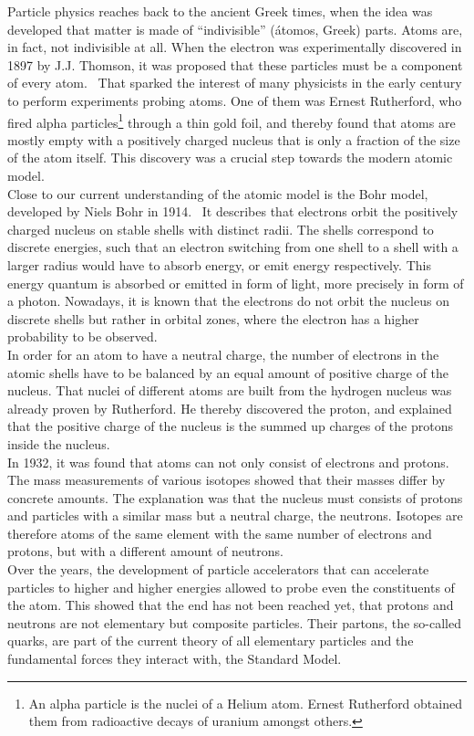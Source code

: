 Particle physics reaches back to the ancient Greek times, when the idea was developed that matter is made of ``indivisible'' (\'atomos, Greek) parts.
Atoms are, in fact, not indivisible at all.
When the electron was experimentally discovered in 1897 by J.J. Thomson, it was proposed that these particles must be a component of every atom.~\cite[p. 13ff]{Griffiths}
That sparked the interest of many physicists in the early  century to perform experiments probing atoms.
One of them was Ernest Rutherford, who fired alpha particles\footnote{An alpha particle is the nuclei of a Helium atom. Ernest Rutherford obtained them from radioactive decays of uranium amongst others.} through a thin gold foil, and thereby found that atoms are mostly empty with a positively charged nucleus that is only a fraction of the size of the atom itself.
This discovery was a crucial step towards the modern atomic model.\\
Close to our current understanding of the atomic model is the Bohr model, developed by Niels Bohr in 1914.~\cite[p. 15]{Griffiths}
It describes that electrons orbit the positively charged nucleus on stable shells with distinct radii.
The shells correspond to discrete energies, such that an electron switching from one shell to a shell with a larger radius would have to absorb energy, or emit energy respectively.
This energy quantum is absorbed or emitted in form of light, more precisely in form of a photon.
Nowadays, it is known that the electrons do not orbit the nucleus on discrete shells but rather in orbital zones, where the electron has a higher probability to be observed.\\
In order for an atom to have a neutral charge, the number of electrons in the atomic shells have to be balanced by an equal amount of positive charge of the nucleus.
That nuclei of different atoms are built from the hydrogen nucleus was already proven by Rutherford.
He thereby discovered the proton, and explained that the positive charge of the nucleus is the summed up charges of the protons inside the nucleus.\\
In 1932, it was found that atoms can not only consist of electrons and protons.~\cite[p. 15]{Griffiths}
The mass measurements of various isotopes showed that their masses differ by concrete amounts.
The explanation was that the nucleus must consists of protons and particles with a similar mass but a neutral charge, the neutrons.
Isotopes are therefore atoms of the same element with the same number of electrons and protons, but with a different amount of neutrons.\\
Over the years, the development of particle accelerators that can accelerate particles to higher and higher energies allowed to probe even the constituents of the atom.
This showed that the end has not been reached yet, that protons and neutrons are not elementary but composite particles.
Their partons, the so-called quarks, are part of the current theory of all elementary particles and the fundamental forces they interact with, the Standard Model.
